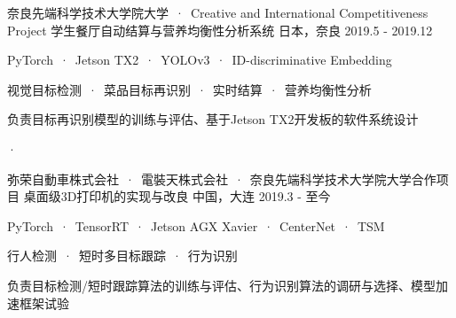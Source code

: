 

\begin{cventries}
  
  \cventryproject 
    {奈良先端科学技术大学院大学\ ·\ Creative and International Competitiveness Project}%
    {学生餐厅自动结算与营养均衡性分析系统} %
    {日本，奈良} %
    {2019.5 - 2019.12} %
    {
      \begin{cvitems} %
        \item {PyTorch\ ·\ Jetson TX2\ ·\ YOLOv3\ ·\ ID-discriminative Embedding}
        \item {视觉目标检测\ ·\ 菜品目标再识别\ ·\ 实时结算\ ·\ 营养均衡性分析}
        \item {负责目标再识别模型的训练与评估、基于Jetson TX2开发板的软件系统设计}
      \end{cvitems}·
    }
    
  \cventryproject 
    {弥荣自動車株式会社\ ·\ 電裝天株式会社\ ·\ 奈良先端科学技术大学院大学\quad 合作项目}%
    {桌面级3D打印机的实现与改良} %
    {中国，大连} %
    {2019.3 - 至今} %
    {
      \begin{cvitems} %
        \item {PyTorch\ ·\ TensorRT\ ·\ Jetson AGX Xavier\ ·\ CenterNet\ ·\ TSM}
        \item {行人检测\ ·\ 短时多目标跟踪\ ·\ 行为识别}
        \item {负责目标检测/短时跟踪算法的训练与评估、行为识别算法的调研与选择、模型加速框架试验}
      \end{cvitems}
    }

\end{cventries}